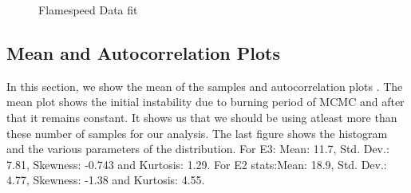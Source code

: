  \begin{figure}[H]
  \ContinuedFloat
  \caption{Flamespeed Data fit}
\end{figure}



\subsection{Mean and Autocorrelation Plots}

In this section, we show the mean of the samples and autocorrelation plots . The mean plot shows the initial instability due to burning period of MCMC and after that it remains constant. It shows us that we should be using atleast more than these number of samples for our analysis. The last figure shows the histogram and the various parameters of the distribution. For E3: Mean:  11.7, Std. Dev.: 7.81, Skewness:  -0.743 and Kurtosis:  1.29. For E2 stats:Mean:  18.9, Std. Dev.:  4.77, Skewness:  -1.38 and Kurtosis:  4.55.

